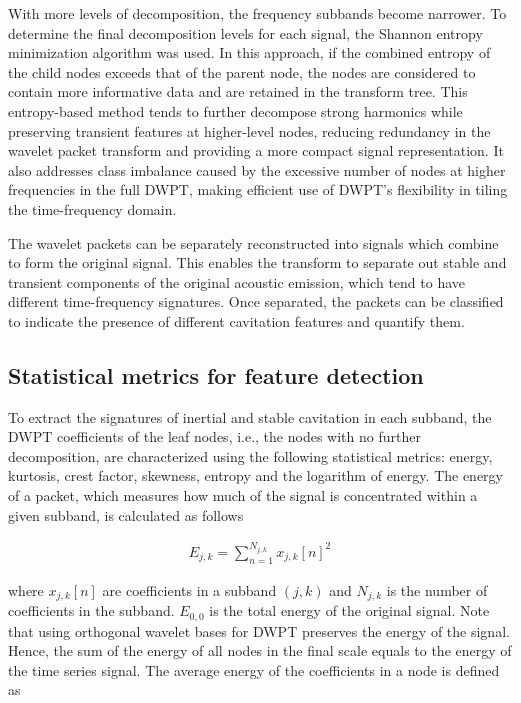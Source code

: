 \documentclass[preprint, linenumbers]{revtex4-2}
\begin{document}
With more levels of decomposition, the frequency subbands become narrower. To determine the final decomposition levels for each signal, the Shannon entropy minimization algorithm was used. \cite{coifman1992} In this approach, if the combined entropy of the child nodes exceeds that of the parent node, the nodes are considered to contain more informative data and are retained in the transform tree. This entropy-based method tends to further decompose strong harmonics while preserving transient features at higher-level nodes, reducing redundancy in the wavelet packet transform and providing a more compact signal representation. It also addresses class imbalance caused by the excessive number of nodes at higher frequencies in the full DWPT, making efficient use of DWPT's flexibility in tiling the time-frequency domain. 

The wavelet packets can be separately reconstructed into signals which combine to form the original signal. This enables the transform to separate out stable and transient components of the original acoustic emission, which tend to have different time-frequency signatures. Once separated, the packets can be classified to indicate the presence of different cavitation features and quantify them.

\subsection{Statistical metrics for feature detection}
\label{sec:statistical_metrics}

To extract the signatures of inertial and stable cavitation in each subband, the DWPT coefficients of the leaf nodes, i.e., the nodes with no further decomposition, are characterized using the following statistical metrics: energy, kurtosis, crest factor, skewness, entropy and the logarithm of energy. The energy of a packet, which measures how much of the signal is concentrated within a given subband, is calculated as follows

\begin{align}
	\label{eq:energy}                           
	E_{j,k} = \sum_{n=1}^{N_{j,k}} x_{j,k}[n]^2 
\end{align}

\noindent where $x_{j,k}[n]$ are coefficients in a subband $(j,k)$ and $N_{j,k}$ is the number of coefficients in the subband. $E_{0,0}$ is the total energy of the original signal. Note that using orthogonal wavelet bases for DWPT preserves the energy of the signal. Hence, the sum of the energy of all nodes in the final scale equals to the energy of the time series signal. The average energy of the coefficients in a node is defined as
\end{document}
